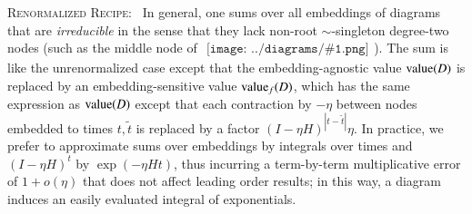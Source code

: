 \documentclass{article}
\newcommand{\dvalue}{\text{\textnormal{value}}}
\newcommand{\wabs}[1]{\left|#1\right|}
\newcommand{\sdia}[1]{\begin{gathered}\texttt{[image: ../diagrams/\#1.png]}\end{gathered}}
\begin{document}
        \textsc{Renormalized Recipe:}~
        In general, one sums over all embeddings of diagrams that are
        \emph{irreducible} in the sense that they lack non-root
        $\sim$-singleton degree-two nodes (such as the middle node of
        $\sdia{(0-1-2)(01-12)}$).  The sum is like the unrenormalized case
        except that the embedding-agnostic value $\dvalue(D)$ is replaced by an
        embedding-sensitive value $\dvalue_f(D)$, which has the same expression
        as $\dvalue(D)$ except that each contraction by $-\eta$ between nodes
        embedded to times $t, \tilde t$ is replaced by a factor $(I-\eta
        H)^{\wabs{t-\tilde t}} \eta$.  In practice, we prefer to approximate
        sums over embeddings by integrals over times and $(I-\eta H)^t$ by
        $\exp(- \eta H t)$, thus incurring a term-by-term multiplicative error
        of $1 + o(\eta)$ that does not affect leading order results; in this
        way, a diagram induces an easily evaluated integral of exponentials.
       
\end{document}
